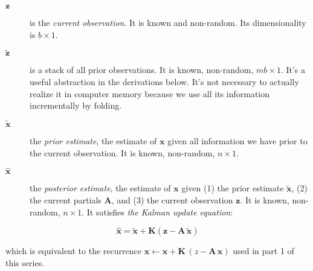 \documentclass[10pt,oneside,x11names]{article}
\begin{document}
\begin{description}
\item[{\(\mathbold{z}\)}] is the \emph{current observation}. It is known and non-random.
Its dimensionality is \(b\times{1}\).

\item[{\(\tilde{\mathbold{z}}\)}] is a stack of all prior observations. It
is known, non-random, \(m b\times{1}\). It's a useful abstraction in the
derivations below. It's not necessary to actually realize it in computer
memory because we use all its information incrementally by folding.

\item[{\({\tilde{\mathbold{x}}}\)}] the \emph{prior estimate}, the estimate of
\(\mathbold{x}\) given all information we have prior to the current
observation. It is known, non-random, \(n\times{1}\).

\item[{\({\hat{\mathbold{x}}}\)}] the \emph{posterior estimate}, the estimate of
\(\mathbold{x}\) given (1) the prior estimate \({\tilde{\mathbold{x}}}\), (2)
the current partials \(\mathbold{A}\), and (3) the current observation
\(\mathbold{z}\). It is known, non-random, \(n\times{1}\). It satisfies
\emph{the Kalman update equation}:
\end{description}

\begin{equation}
\label{eqn:kalman-update-equation}
{\hat{\mathbold{x}}} =
{\tilde{\mathbold{x}}} +
\mathbold{K}
\left(
\mathbold{z}-
\mathbold{A}\,
{\tilde{\mathbold{x}}}
\right)
\end{equation}

\noindent which is equivalent to  the recurrence
\(\mathbold{x}\leftarrow\mathbold{x}+\mathbold{K}\,(z-\mathbold{A}\,\mathbold{x})\)
used in part 1 of this series.
\end{document}
